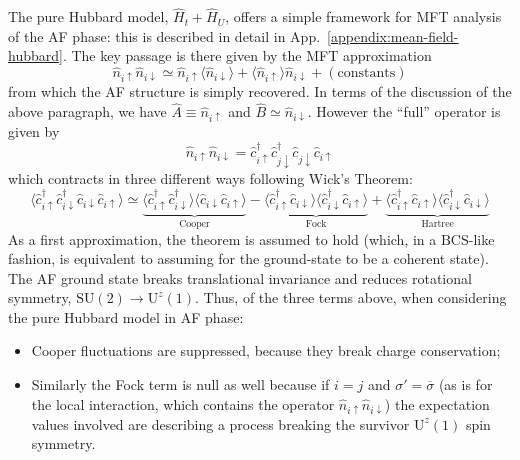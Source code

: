 The pure Hubbard model, $\hat H_t + \hat H_U$, offers a simple framework for MFT analysis of the AF phase: this is described in detail in App.~\ref{appendix:mean-field-hubbard}. The key passage is there given by the MFT approximation
\begin{equation}\label{eq:mft-pure-hubbard-wick-decomposition}
	\hat n_{i\uparrow} \hat n_{i\downarrow} \simeq \hat n_{i\uparrow} \langle \hat n_{i\downarrow} \rangle + \langle \hat n_{i\uparrow} \rangle \hat n_{i\downarrow} + (\mathrm{constants})
\end{equation}
from which the AF structure is simply recovered.
In terms of the discussion of the above paragraph, we have $\hat A \equiv \hat n_{i\uparrow}$ and $\hat B \simeq \hat n_{i\downarrow}$. However the ``full'' operator is given by
\[
	\hat n_{i\uparrow} \hat n_{i\downarrow} = \hat c_{i\uparrow}^\dagger \hat c_{j\downarrow}^\dagger \hat c_{j\downarrow} \hat c_{i\uparrow}
\]
which contracts in three different ways following Wick's Theorem:
\begin{equation}\label{eq:mft-extended-hubbard-wick-decomposition}
	\langle
	\hat c_{i\uparrow}^\dagger \hat c_{i\downarrow}^\dagger \hat c_{i\downarrow} \hat c_{i\uparrow}
	\rangle \simeq \underbrace{
		\langle 
		\hat c_{i\uparrow}^\dagger \hat c_{i\downarrow}^\dagger
		\rangle \langle	
		\hat c_{i\downarrow} \hat c_{i\uparrow} 
		\rangle 
	}_{\text{Cooper}}
	- 
	\underbrace{
		\langle 
		\hat c_{i\uparrow}^\dagger \hat c_{i\downarrow}
		\rangle \langle	
		\hat c_{i\downarrow}^\dagger \hat c_{i\uparrow} 
		\rangle 
	}_{\text{Fock}}
	+ 
	\underbrace{
		\langle 
		\hat c_{i\uparrow}^\dagger \hat c_{i\uparrow}
		\rangle \langle	
		\hat c_{i\downarrow}^\dagger \hat c_{i\downarrow} 
		\rangle
	}_{\text{Hartree}}
\end{equation}
As a first approximation, the theorem is assumed to hold (which, in a $\mathrm{BCS}$-like fashion, is equivalent to assuming for the ground-state to be a coherent state). The AF ground state breaks translational invariance and reduces rotational symmetry, $\mathrm{SU}(2) \to \mathrm{U}^z(1)$. Thus, of the three terms above, when considering the pure Hubbard model in AF phase: 
\begin{itemize}
	\item Cooper fluctuations are suppressed, because they break charge conservation;
	\item Similarly the Fock term is null as well because if $i=j$ and $\sigma'=\overline{\sigma}$ (as is for the local interaction, which contains the operator $\hat n_{i\uparrow} \hat n_{i\downarrow}$) the expectation values involved are describing a process breaking the survivor $\mathrm{U}^z(1)$ spin symmetry. 
\end{itemize}
